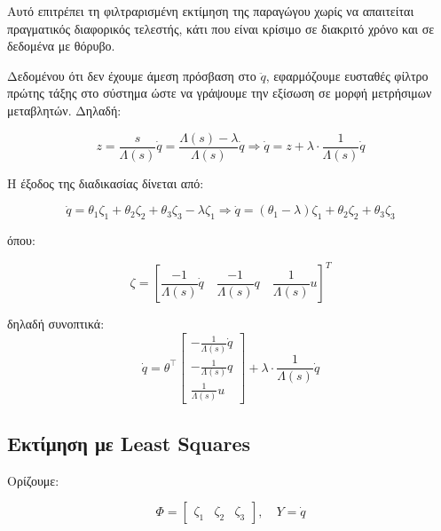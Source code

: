 \documentclass[a4paper,12pt]{report}
\newcommand{\en}{\selectlanguage{english}}
\newcommand{\gr}{\selectlanguage{greek}}
\begin{document}
\hspace{-0.6cm}Αυτό επιτρέπει τη φιλτραρισμένη εκτίμηση της παραγώγου χωρίς να απαιτείται πραγματικός διαφορικός τελεστής, κάτι που είναι κρίσιμο σε διακριτό χρόνο και σε δεδομένα με θόρυβο.

\hspace{-0.6cm}Δεδομένου ότι δεν έχουμε άμεση πρόσβαση στο \( \ddot{q} \), εφαρμόζουμε ευσταθές φίλτρο πρώτης τάξης στο σύστημα ώστε να γράψουμε την εξίσωση σε μορφή μετρήσιμων μεταβλητών. Δηλαδή:

\begin{equation}
z = \frac{s}{\Lambda(s)} \dot{q} = \frac{\Lambda(s) - \lambda}{\Lambda(s)} \dot{q}
\Rightarrow 
\dot{q} = z + \lambda \cdot \frac{1}{\Lambda(s)} \dot{q}
\end{equation}

\hspace{-0.6cm}Η έξοδος της διαδικασίας δίνεται από:

\begin{equation}
\dot{q} = \theta_1 \zeta_1 + \theta_2 \zeta_2 + \theta_3 \zeta_3 - \lambda \zeta_1
\Rightarrow
\dot{q} = (\theta_1 - \lambda) \zeta_1 + \theta_2 \zeta_2 + \theta_3 \zeta_3
\end{equation}

\hspace{-0.6cm}όπου:

\begin{equation}
\zeta = 
\left[
\frac{-1}{\Lambda(s)} \dot{q} \quad
\frac{-1}{\Lambda(s)} q \quad
\frac{1}{\Lambda(s)} u
\right]^T
\end{equation}

\hspace{-0.6cm}δηλαδή συνοπτικά:
\[
\dot{q} = \theta^\top
\left[
\begin{array}{c}
-\frac{1}{\Lambda(s)} \dot{q} \\
-\frac{1}{\Lambda(s)} q \\
\frac{1}{\Lambda(s)} u
\end{array}
\right]
+ \lambda \cdot \frac{1}{\Lambda(s)} \dot{q}
\]

\subsection*{Εκτίμηση με \en Least Squares \gr}

Ορίζουμε:

\[
\Phi = 
\begin{bmatrix}
\zeta_1 & \zeta_2 & \zeta_3
\end{bmatrix},
\quad
Y = \dot{q}
\]
\end{document}
